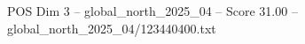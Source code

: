 \begin{textsample}{POS Dim 3 – global\_north\_2025\_04 – Score 31.00 – global\_north\_2025\_04/123440400.txt}
\end{textsample}
